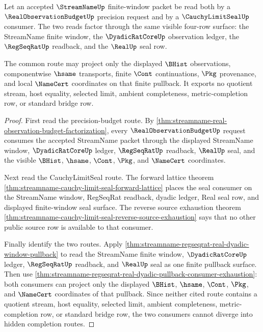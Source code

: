 \begin{theorem}
\label{thm:streamname-observation-budget-cauchy-limit-seal-compatibility}
Let an accepted $\StreamNameUp$ finite-window packet be read both by a
$\RealObservationBudgetUp$ precision request and by a $\CauchyLimitSealUp$
consumer. The two reads factor through the same visible four-row surface:
the StreamName finite window, the $\DyadicRatCoreUp$ observation ledger, the
$\RegSeqRatUp$ readback, and the $\RealUp$ seal row.

The common route may project only the displayed $\BHist$ observations,
componentwise $\hsame$ transports, finite $\Cont$ continuations, $\Pkg$
provenance, and local $\NameCert$ coordinates on that finite pullback. It
exports no quotient stream, host equality, selected limit, ambient
completeness, metric-completion row, or standard bridge row.
\end{theorem}
\begin{proof}
First read the precision-budget route. By
\autoref{thm:streamname-real-observation-budget-factorization}, every
$\RealObservationBudgetUp$ request consumes the accepted StreamName packet
through the displayed StreamName window, $\DyadicRatCoreUp$ ledger,
$\RegSeqRatUp$ readback, $\RealUp$ seal, and the visible $\BHist$, $\hsame$,
$\Cont$, $\Pkg$, and $\NameCert$ coordinates.

Next read the CauchyLimitSeal route. The forward lattice theorem
\autoref{thm:streamname-cauchy-limit-seal-forward-lattice} places the seal
consumer on the StreamName window, RegSeqRat readback, dyadic ledger, Real
seal row, and displayed finite-window seal surface. The reverse source
exhaustion theorem
\autoref{thm:streamname-cauchy-limit-seal-reverse-source-exhaustion} says that
no other public source row is available to that consumer.

Finally identify the two routes. Apply
\autoref{thm:streamname-regseqrat-real-dyadic-window-pullback} to read the
StreamName finite window, $\DyadicRatCoreUp$ ledger, $\RegSeqRatUp$ readback,
and $\RealUp$ seal as one finite pullback surface. Then use
\autoref{thm:streamname-regseqrat-real-dyadic-pullback-consumer-exhaustion}:
both consumers can project only the displayed $\BHist$, $\hsame$, $\Cont$,
$\Pkg$, and $\NameCert$ coordinates of that pullback. Since neither cited
route contains a quotient stream, host equality, selected limit, ambient
completeness, metric-completion row, or standard bridge row, the two
consumers cannot diverge into hidden completion routes.
\end{proof}

